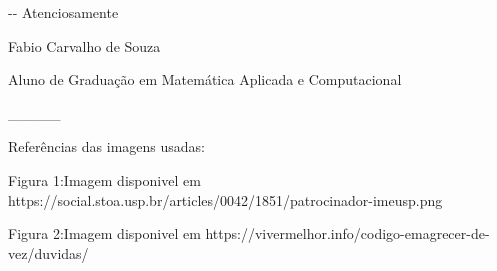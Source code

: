 \documentclass[12pt]{article}
\makeatletter
\newenvironment{indentation}[3]%
	{\par\setlength{\parindent}{#3}
	\setlength{\leftmargin}{#1}       \setlength{\rightmargin}{#2}%
	\advance\linewidth -\leftmargin       \advance\linewidth -\rightmargin%
	\advance\@totalleftmargin\leftmargin  \@setpar{{\@@par}}%
	\parshape 1\@totalleftmargin \linewidth\ignorespaces}{\par}%
\makeatother
\begin{document}
\begin{indentation}{0pt}{0pt}{35pt}
   \noindent
   \textsf{Atenciosamente}
   
   \noindent
   \textsf{Fabio Carvalho de Souza }
   
   \noindent
   \textsf{Aluno de Graduação em Matemática Aplicada e Computacional }
   
   \noindent
   \textsf{\_\_\_\_\_}
   
   \noindent
   \textsf{Referências das imagens usadas:}
   
   \noindent
   \textsf{Figura 1:Imagem disponivel em https://social.stoa.usp.br/articles/0042/1851/patrocinador-imeusp.png}
   
   \noindent    
   \textsf{Figura 2:Imagem disponivel em https://vivermelhor.info/codigo-emagrecer-de-vez/duvidas/}
   \end{indentation} 
   
  
  
\end{document}
